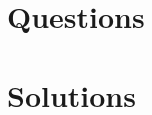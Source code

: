\documentclass[a4paper,12pt]{book}
\begin{document}
\tableofcontents

\part{Questions}


\part{Solutions}


\end{document}

